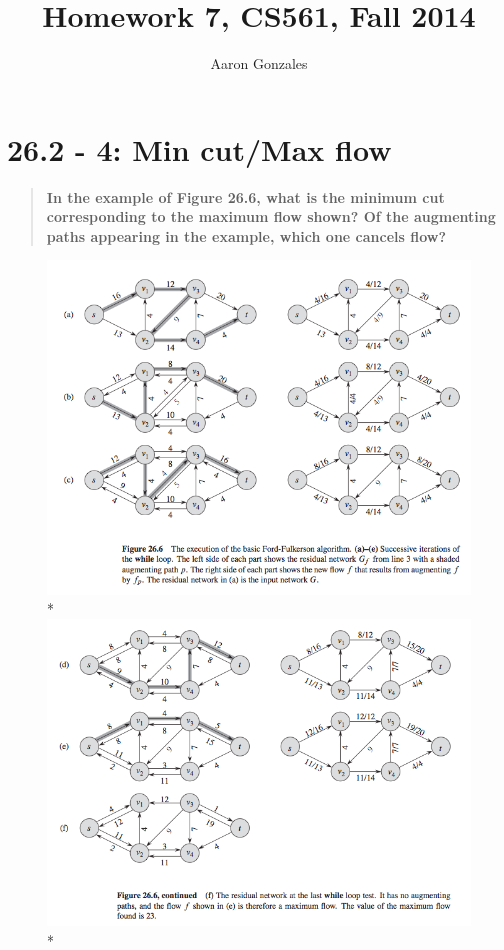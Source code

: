 \documentclass[titlepage]{article}\usepackage[]{graphicx}\usepackage[]{color}
\begin{document}
\title{Homework 7, CS561, Fall 2014}
\author{Aaron Gonzales}


\section{26.2 - 4: Min cut/Max flow}
  \begin{quote}
    \textbf{In the example of Figure 26.6, what is the minimum cut corresponding
    to the maximum flow shown? Of the augmenting paths appearing in the
    example, which one cancels flow?}
  \end{quote}

  \begin{figure}
    \begin{center}
    \includegraphics[scale=0.40]{26.6a.png}\\*
    \includegraphics[scale=0.40]{26.6b.png}\\*
  \end{center}
  \end{figure}
\end{document}
